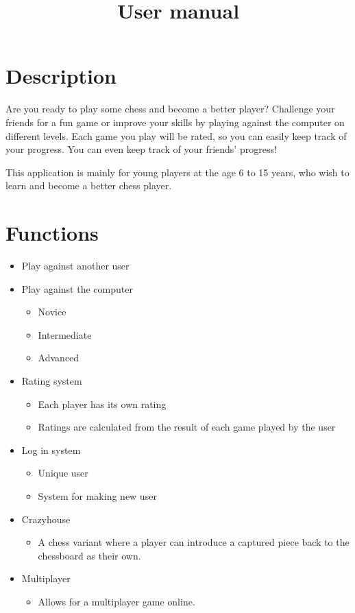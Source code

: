 \documentclass{article}
\title{User manual}
\begin{document}
\date{}
\maketitle


\section{Description}
Are you ready to play some chess and become a better player? Challenge your friends for a fun game or improve your skills by playing against the computer on different levels. Each game you play will be rated, so you can easily keep track of your progress. You can even keep track of your friends' progress! 

This application is mainly for young players at the age 6 to 15 years, who wish to learn and become a better chess player.

\section{Functions}
\begin{itemize}
\item Play against another user
\item Play against the computer
	\begin{itemize}
	\item Novice
    \item Intermediate
    \item Advanced
	\end{itemize}
\item Rating system
	\begin{itemize}
	\item Each player has its own rating
    \item Ratings are calculated from the result of each game played by the user
	\end{itemize}
\item Log in system
	\begin{itemize}
	\item Unique user
    \item System for making new user
	\end{itemize}
\item Crazyhouse
	\begin{itemize}
	\item A chess variant where a player can introduce a captured piece back to the chessboard as their own.
	\end{itemize}
\item Multiplayer
\begin{itemize}
\item Allows for a multiplayer game online.
\end{itemize}
\end{itemize}
\end{document}
